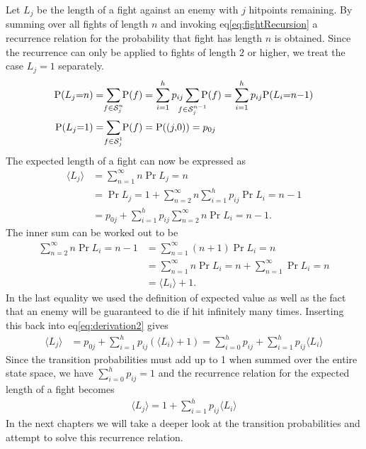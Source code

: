 Let $L_j$ be the length of a fight against an enemy with $j$ hitpoints remaining.
By summing over all fights of length $n$ and invoking eq\ref{eq:fightRecursion} a recurrence relation for the probability that fight has length $n$ is obtained. Since the recurrence can only be applied to fights of length $2$ or higher, we treat the case $L_j = 1$ separately.
\begin{align}\label{eq:probabilityRecursion}
    \Pr{L_j = n} &= \sum_{\mathclap{f \in \mathcal{S}_j^n}}\Pr{f}
            = \sum_{i=1}^h p_{ij} \sum_{\mathclap{f \in \mathcal{S}_j^{n-1}}}\Pr{f}
            = \sum_{i=1}^h p_{ij} \Pr{L_i = n-1}\\
    \Pr{L_j = 1} &= \sum_{\mathclap{f \in \mathcal{S}_j^1}}\Pr{f}
            = \Pr{(j,0}) = p_{0j}
\end{align}
The expected length of a fight can now be expressed as
\begin{align}
	\langle L_j \rangle &= \sum_{n=1}^{\infty}n\Pr{L_j=n}\nonumber\\
       &= \Pr{L_j=1} + \sum_{n=2}^{\infty}n\sum_{i=1}^h p_{ij} \Pr{L_i=n-1}\nonumber\\
       &= p_{0j} + \sum_{i=1}^h p_{ij} \sum_{n=2}^{\infty}n\Pr{L_i=n-1}.\label{eq:derivation2}
\end{align}
The inner sum can be worked out to be
\begin{align}
    \sum_{n=2}^{\infty}n\Pr{L_i=n-1}
       &= \sum_{n=1}^{\infty}(n+1)\Pr{L_i=n} \nonumber\\
	   &= \sum_{n=1}^{\infty}n\Pr{L_i=n} + \sum_{n=1}^{\infty}\Pr{L_i=n}\nonumber\\
	   &= \langle L_i \rangle + 1.
\end{align}
In the last equality we used the definition of expected value as well as the fact that an enemy will be guaranteed to die if hit infinitely many times. Inserting this back into eq\ref{eq:derivation2} gives
\begin{align}
    \langle L_j \rangle
        &= p_{0j} + \sum_{i=1}^h p_{ij}(\langle L_i \rangle+1)
        = \sum_{i=0}^h p_{ij} + \sum_{i=1}^h p_{ij}\langle L_i \rangle
\end{align}
Since the transition probabilities must add up to 1 when summed over the entire state space, we have $\sum_{i=0}^{h}p_{ij} = 1$ and the recurrence relation for the expected length of a fight becomes
\begin{align}
	\boxed{\langle L_j \rangle
		= 1 + \sum_{i=1}^h p_{ij}\langle L_i \rangle}\label{eq:fightLengthRecursion}
\end{align}
In the next chapters we will take a deeper look at the transition probabilities and attempt to solve this recurrence relation.

